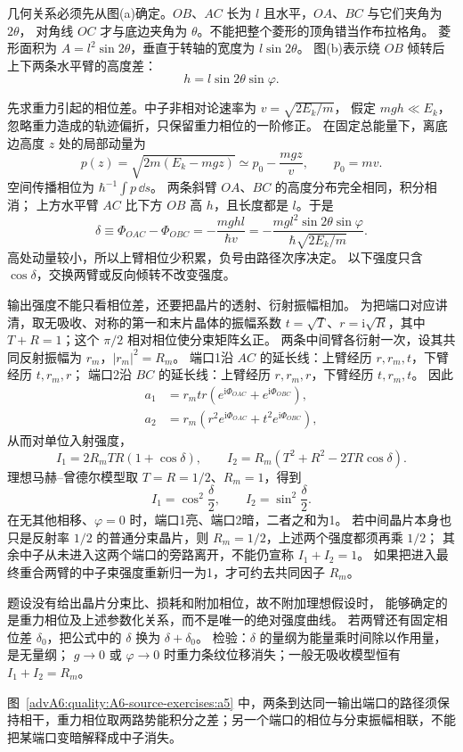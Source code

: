 \begin{advsolution}
几何关系必须先从图(a)确定。$OB$、$AC$ 长为 $l$ 且水平，$OA$、$BC$ 与它们夹角为 $2\theta$，
对角线 $OC$ 才与底边夹角为 $\theta$。不能把整个菱形的顶角错当作布拉格角。
菱形面积为 $A=l^2\sin2\theta$，垂直于转轴的宽度为 $l\sin2\theta$。
图(b)表示绕 $OB$ 倾转后上下两条水平臂的高度差：
\[
 h=l\sin2\theta\sin\varphi.
\]

先求重力引起的相位差。中子非相对论速率为 $v=\sqrt{2E_k/m}$，
假定 $mgh\ll E_k$，忽略重力造成的轨迹偏折，只保留重力相位的一阶修正。
在固定总能量下，离底边高度 $z$ 处的局部动量为
\[
 p(z)=\sqrt{2m(E_k-mgz)}
 \simeq p_0-\frac{mgz}{v},\qquad p_0=mv.
\]
空间传播相位为 $\hbar^{-1}\int p\,\dd s$。
两条斜臂 $OA$、$BC$ 的高度分布完全相同，积分相消；
上方水平臂 $AC$ 比下方 $OB$ 高 $h$，且长度都是 $l$。于是
\[
 \delta\equiv\Phi_{OAC}-\Phi_{OBC}
 =-\frac{mghl}{\hbar v}
 =-\frac{mg l^2\sin2\theta\sin\varphi}{\hbar\sqrt{2E_k/m}}.
\]
高处动量较小，所以上臂相位少积累，负号由路径次序决定。
以下强度只含 $\cos\delta$，交换两臂或反向倾转不改变强度。

输出强度不能只看相位差，还要把晶片的透射、衍射振幅相加。
为把端口对应讲清，取无吸收、对称的第一和末片晶体的振幅系数
$t=\sqrt T$、$r=\mathrm i\sqrt R$，其中 $T+R=1$；这个 $\pi/2$ 相对相位使分束矩阵幺正。
两条中间臂各衍射一次，设其共同反射振幅为 $r_m$，$|r_m|^2=R_m$。
端口1沿 $AC$ 的延长线：上臂经历 $r,r_m,t$，下臂经历 $t,r_m,r$；
端口2沿 $BC$ 的延长线：上臂经历 $r,r_m,r$，下臂经历 $t,r_m,t$。
因此
\begin{align*}
 a_1&=r_mtr\left(e^{\mathrm i\Phi_{OAC}}+e^{\mathrm i\Phi_{OBC}}\right),\\
 a_2&=r_m\left(r^2e^{\mathrm i\Phi_{OAC}}+t^2e^{\mathrm i\Phi_{OBC}}\right),
\end{align*}
从而对单位入射强度，
\[
 \boxed{I_1=2R_mTR(1+\cos\delta)},\qquad
 \boxed{I_2=R_m(T^2+R^2-2TR\cos\delta)}.
\]
理想马赫--曾德尔模型取 $T=R=1/2$、$R_m=1$，得到
\[
 \boxed{I_1=\cos^2\frac\delta2,\qquad I_2=\sin^2\frac\delta2}.
\]
在无其他相移、$\varphi=0$ 时，端口1亮、端口2暗，二者之和为1。
若中间晶片本身也只是反射率 $1/2$ 的普通分束晶片，则 $R_m=1/2$，上述两个强度都须再乘 $1/2$；
其余中子从未进入这两个端口的旁路离开，不能仍宣称 $I_1+I_2=1$。
如果把进入最终重合两臂的中子束强度重新归一为1，才可约去共同因子 $R_m$。

题设没有给出晶片分束比、损耗和附加相位，故不附加理想假设时，
能够确定的是重力相位及上述参数化关系，而不是唯一的绝对强度曲线。
若两臂还有固定相位差 $\delta_0$，把公式中的 $\delta$ 换为 $\delta+\delta_0$。
检验：$\delta$ 的量纲为能量乘时间除以作用量，是无量纲；
$g\to0$ 或 $\varphi\to0$ 时重力条纹位移消失；一般无吸收模型恒有 $I_1+I_2=R_m$。

图~\ref{advA6:quality:A6-source-exercises:a5} 中，两条到达同一输出端口的路径须保持相干，重力相位取两路势能积分之差；另一个端口的相位与分束振幅相联，不能把某端口变暗解释成中子消失。
\end{advsolution}

